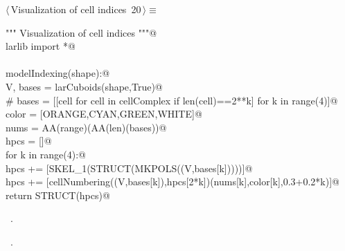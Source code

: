 \documentclass[11pt,oneside]{article}	%
\begin{document}
\begin{flushleft} \small \label{scrap32}
\protect{}$\langle\,$Visualization of cell indices\nobreak\ {\footnotesize 20}$\,\rangle\equiv$
\vspace{-1ex}
\begin{list}{}{} \item
\mbox{}\verb@""" Visualization of cell indices """@\\
\mbox{}\verb@from larlib import *@\\
\mbox{}\verb@@\\
\mbox{}\verb@def modelIndexing(shape):@\\
\mbox{}\verb@   V, bases = larCuboids(shape,True)@\\
\mbox{}\verb@   # bases = [[cell for cell in cellComplex if len(cell)==2**k] for k in range(4)]@\\
\mbox{}\verb@   color = [ORANGE,CYAN,GREEN,WHITE]@\\
\mbox{}\verb@   nums = AA(range)(AA(len)(bases))@\\
\mbox{}\verb@   hpcs = []@\\
\mbox{}\verb@   for k in range(4):@\\
\mbox{}\verb@      hpcs += [SKEL_1(STRUCT(MKPOLS((V,bases[k]))))]@\\
\mbox{}\verb@      hpcs += [cellNumbering((V,bases[k]),hpcs[2*k])(nums[k],color[k],0.3+0.2*k)]@\\
\mbox{}\verb@   return STRUCT(hpcs)@\\
\mbox{}\verb@@{\NWsep}
\end{list}
\vspace{-1ex}
\footnotesize\addtolength{\baselineskip}{-1ex}
\begin{list}{}{\setlength{\itemsep}{-\parsep}\setlength{\itemindent}{-\leftmargin}}
\item \NWtxtMacroDefBy\ .
\item \NWtxtMacroRefIn\ .
\end{list}
\end{flushleft}
\end{document}
